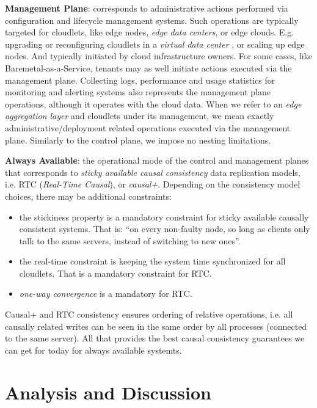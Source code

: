 \documentclass[conference]{IEEEtran}
\begin{document}
\textbf{Management Plane}: corresponds to administrative actions performed via
configuration and lifecycle management systems. Such operations are typically
targeted for cloudlets, like edge nodes, \textit{edge data centers}\cite{b3},
or edge clouds. E.g.  upgrading or reconfiguring cloudlets in a \textit{virtual
data center} \cite{b3}, or scaling up edge nodes. And typically initiated by
cloud infrastructure owners. For some cases, like Baremetal-as-a-Service,
tenants may as well initiate actions executed via the management plane.
Collecting logs, performance and usage statistics for monitoring and alerting
systems also represents the management plane operations, although it operates
with the cloud data. When we refer to an \textit{edge aggregation
layer}\cite{b3} and cloudlets under its management, we mean exactly
administrative/deployment related operations executed via the management plane.
Similarly to the control plane, we impose no nesting limitations.

\textbf{Always Available}: the operational mode of the control and management
planes that corresponds to \textit{sticky available causal
consistency}\cite{b4} data replication models, i.e. RTC (\textit{Real-Time
Causal}\cite{b2}), or \textit{causal+}\cite{b1}. Depending on the consistency
model choices, there may be additional constraints:

\begin{itemize}
  \item the stickiness property is a mandatory constraint for sticky available
    causally consistent systems. That is: ``on every non-faulty node, so long
    as clients only talk to the same servers, instead of switching to new
    ones''\cite{b4}.
  \item the real-time constraint is keeping the system time synchronized for
    all cloudlets. That is a mandatory constraint for RTC.
  \item \textit{one-way convergence}\cite{b2} is a mandatory for RTC.
\end{itemize}

Causal+ and RTC consistency ensures ordering of relative operations, i.e.
all causally related writes can be seen in the same order by all processes
(connected to the same server). All that provides the best causal consistency
guarantees we can get for today for always available systemts.

\section{Analysis and Discussion}
\end{document}
